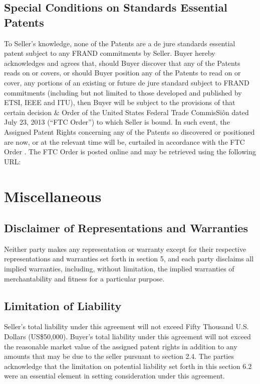 \documentclass[letterpaper,10pt,openany,oneside,english]{sphinxmanual}
\begin{document}
\subsection{Special Conditions on Standards Essential Patents}
\label{\detokenize{6-representations:special-conditions-on-standards-essential-patents}}
To Seller’s knowledge, none of the Patents are a de jure standards essential patent subject to any FRAND commitments by Seller. Buyer hereby acknowledges and agrees that, should Buyer discover that any of the Patents reads on or covers, or should Buyer position any of the Patents to read on or cover, any portions of an existing or future de jure standard subject to FRAND commitments (including but not limited to those developed and published by ETSI, IEEE and ITU), then Buyer will be subject to the provisions of that certain decision \& Order of the United States Federal Trade CommisSiôn dated July 23, 2013 (“FTC Order”) to which Seller is bound. In such event, the Assigned Patent Rights concerning any of the Patents so discovered or positioned are now, or at the relevant time will be, curtailed in accordance with the FTC Order . The FTC Order is posted online and may be retrieved using the following URL:



\section{Miscellaneous}
\label{\detokenize{7-miscellaneous:miscellaneous}}\label{\detokenize{7-miscellaneous::doc}}

\subsection{Disclaimer of Representations and Warranties}
\label{\detokenize{7-miscellaneous:disclaimer-of-representations-and-warranties}}
Neither party makes any representation or warranty except for their respective representations and warranties set forth in section 5, and each party disclaims all implied warranties, including, without limitation, the implied warranties of merchantability and fitness for a particular purpose.


\subsection{Limitation of Liability}
\label{\detokenize{7-miscellaneous:limitation-of-liability}}
Seller’s total liability under this agreement will not exceed Fifty Thousand U.S. Dollars (US\$50,000). Buyer’s total liability under this agreement will not exceed the reasonable market value of the assigned patent rights in addition to any amounts that may be due to the seller pursuant to section 2.4. The parties acknowledge that the limitation on potential liability set forth in this section 6.2 were an essential element in setting consideration under this agreement.
\end{document}
